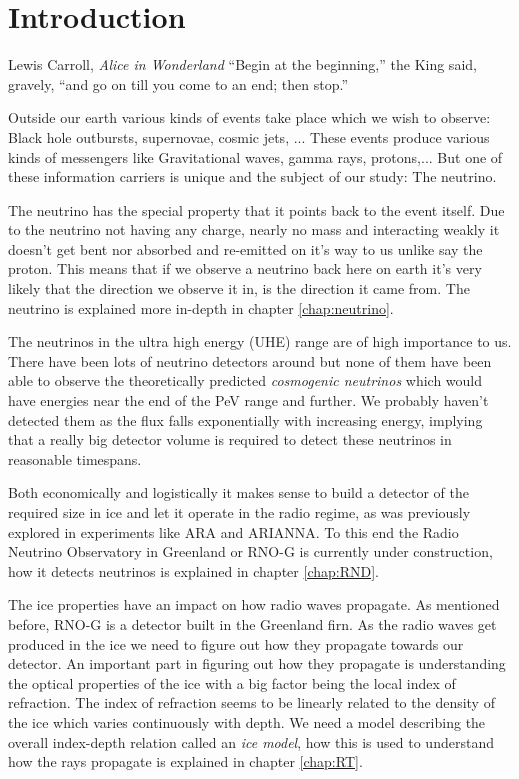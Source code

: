 \chapter*{Introduction}
\begin{chapquote}{Lewis Carroll, \textit{Alice in Wonderland}}
``Begin at the beginning,'' the King said, gravely, ``and go on till you
come to an end; then stop.''
\end{chapquote}
Outside our earth various kinds of events take place which we wish to 
observe: Black hole outbursts, supernovae, cosmic jets, ...
These events produce various kinds of messengers like 
Gravitational waves, gamma rays, protons,...
But one of these information carriers is unique and
the subject of our study: The neutrino. 

The neutrino has the special property that it points back to the event itself.
Due to the neutrino not having any charge, nearly no mass and 
interacting weakly it doesn't get bent nor absorbed and re-emitted 
on it's way to us unlike say the proton. This means that if we observe
a neutrino back here on earth it's very likely that the direction we observe
it in, is the direction it came from. The neutrino is explained more in-depth in chapter
\ref{chap:neutrino}.

The neutrinos in the ultra high energy (UHE) range are of high importance to
us.  There have been lots of neutrino detectors around but none of them have
been able to observe the theoretically predicted \textit{cosmogenic neutrinos}
which would have energies near the end of the PeV range and further.  We
probably haven't detected them as the flux falls exponentially with increasing
energy, implying that a really big detector volume is required to detect these
neutrinos in reasonable timespans. 

Both economically and logistically it makes sense to build a detector of the
required size in ice and let it operate in the radio regime, as was previously
explored in experiments like ARA and ARIANNA.  To this end the Radio Neutrino
Observatory in Greenland or RNO-G is currently under construction, how it 
detects neutrinos is explained in chapter \ref{chap:RND}.

The ice properties have an impact on how radio waves propagate. As mentioned
before, RNO-G is a detector built in the Greenland firn. As the radio waves get
produced in the ice we need to figure out how they propagate towards our
detector. An important part in figuring out how they propagate is understanding
the optical properties of the ice with a big factor being the local index of
refraction. The index of refraction seems to be linearly related to the density of the ice which
varies continuously with depth. We need a model describing the overall index-depth relation
called an \textit{ice model}, how this is used to understand how the rays propagate
is explained in chapter \ref{chap:RT}.

